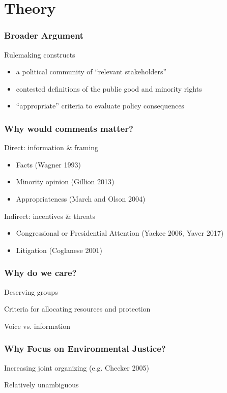 \documentclass[10pt]{beamer}
\begin{document}
\section{Theory}

\begin{frame}
\frametitle{Broader Argument}

Rulemaking constructs
\begin{itemize}
\item a political community of “relevant stakeholders” 
\item contested definitions of the public good and minority rights 
\item “appropriate” criteria to evaluate policy consequences
\end{itemize}


\end{frame}


\begin{frame}
\frametitle{Why would comments matter?}

Direct: information \& framing
\begin{itemize}
\item Facts (Wagner 1993) 
\item Minority opinion (Gillion 2013)
\item Appropriateness (March and Olson 2004)
\end{itemize}

Indirect: incentives \& threats
\begin{itemize}
\item Congressional or Presidential Attention (Yackee 2006, Yaver 2017)
\item Litigation (Coglanese 2001)
\end{itemize}
\end{frame}

\begin{frame}
\frametitle{Why do we care?}

Deserving groups

\bigskip

Criteria for allocating resources and protection

\bigskip

Voice vs. information 


\end{frame}

\begin{frame}
\frametitle{Why Focus on Environmental Justice?}

Increasing joint organizing (e.g. Checker 2005) 

\bigskip

Relatively unambiguous

\end{frame}
\end{document}
